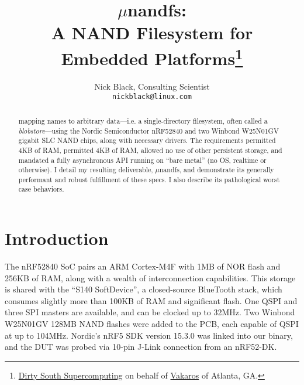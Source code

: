\documentclass[letterpaper,10pt]{article}
\title{$\mu$nandfs:\\
A NAND Filesystem for Embedded Platforms\thanks{
 \href{https://www.dsscaw.com/}{Dirty South Supercomputing} on behalf
 of \href{https://www.vakaros.com/}{Vakaros} of Atlanta, GA.
}\\
}
\author{Nick Black, Consulting Scientist\\
\texttt{nickblack@linux.com}
}
\begin{document}
\maketitle
\thispagestyle{fancy}
\date{}
\begin{abstract}
\setlength{\parindent}{0pt}
mapping names to arbitrary data---i.e. a single-directory filesystem, often called a
\textit{blobstore}---using the Nordic Semiconductor nRF52840 and two Winbond
W25N01GV gigabit SLC NAND chips, along with necessary drivers. The requirements permitted 4KB of RAM,
permitted 4KB of RAM, allowed no use of other persistent storage, and mandated
a fully asynchronous API running on ``bare metal'' (no OS, realtime or
otherwise). I detail my
resulting deliverable, $\mu$nandfs, and demonstrate its generally performant
and robust fulfillment of these specs. I also describe its pathological worst
case behaviors.
\end{abstract}
\section{Introduction}
The nRF52840\parencite{nrf52840} SoC pairs an ARM Cortex-M4F with 1MB of
NOR flash and 256KB of RAM, along with a wealth of interconnection
capabilities. This storage is shared with the ``S140
SoftDevice''\parencite{s140}, a closed-source BlueTooth stack, which consumes
slightly more than 100KB of RAM and significant flash. One QSPI and three SPI
masters are available, and can be clocked up to 32MHz. Two Winbond W25N01GV\parencite{winbond}
128MB NAND flashes were added to the PCB, each capable of QSPI at up to 104MHz.
Nordic's nRF5 SDK\parencite{nrf52sdk} version 15.3.0 was linked into our binary,
and the DUT was probed via 10-pin J-Link\parencite{segger} connection from
an nRF52-DK\parencite{nrf52dk}.

\printbibliography
\end{document}
